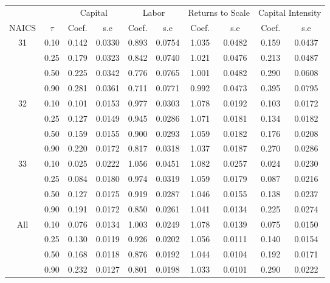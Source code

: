\begin{table}[H]
\centering
\begin{tabular}{cccccccccc}
  \hline\hline & & \multicolumn{2}{c}{Capital}  & \multicolumn{2}{c}{Labor} & \multicolumn{2}{c}{Returns to Scale} & \multicolumn{2}{c}{Capital Intensity}\\ \cmidrule(lr){3-4} \cmidrule(lr){5-6} \cmidrule(lr){7-8} \cmidrule(lr){9-10}NAICS & $\tau$ & Coef. & s.e & Coef. & s.e & Coef. & s.e & Coef. & s.e \\ 
  \hline
31 & 0.10 & 0.142 & 0.0330 & 0.893 & 0.0754 & 1.035 & 0.0482 & 0.159 & 0.0437 \\ 
   & 0.25 & 0.179 & 0.0323 & 0.842 & 0.0740 & 1.021 & 0.0476 & 0.213 & 0.0487 \\ 
   & 0.50 & 0.225 & 0.0342 & 0.776 & 0.0765 & 1.001 & 0.0482 & 0.290 & 0.0608 \\ 
   & 0.90 & 0.281 & 0.0361 & 0.711 & 0.0771 & 0.992 & 0.0473 & 0.395 & 0.0795 \\ 
  32 & 0.10 & 0.101 & 0.0153 & 0.977 & 0.0303 & 1.078 & 0.0192 & 0.103 & 0.0172 \\ 
   & 0.25 & 0.127 & 0.0149 & 0.945 & 0.0286 & 1.071 & 0.0181 & 0.134 & 0.0182 \\ 
   & 0.50 & 0.159 & 0.0155 & 0.900 & 0.0293 & 1.059 & 0.0182 & 0.176 & 0.0208 \\ 
   & 0.90 & 0.220 & 0.0172 & 0.817 & 0.0318 & 1.037 & 0.0187 & 0.270 & 0.0286 \\ 
  33 & 0.10 & 0.025 & 0.0222 & 1.056 & 0.0451 & 1.082 & 0.0257 & 0.024 & 0.0230 \\ 
   & 0.25 & 0.084 & 0.0180 & 0.974 & 0.0319 & 1.059 & 0.0179 & 0.087 & 0.0216 \\ 
   & 0.50 & 0.127 & 0.0175 & 0.919 & 0.0287 & 1.046 & 0.0155 & 0.138 & 0.0237 \\ 
   & 0.90 & 0.191 & 0.0172 & 0.850 & 0.0261 & 1.041 & 0.0134 & 0.225 & 0.0274 \\ 
  All & 0.10 & 0.076 & 0.0134 & 1.003 & 0.0249 & 1.078 & 0.0139 & 0.075 & 0.0150 \\ 
   & 0.25 & 0.130 & 0.0119 & 0.926 & 0.0202 & 1.056 & 0.0111 & 0.140 & 0.0154 \\ 
   & 0.50 & 0.168 & 0.0118 & 0.876 & 0.0192 & 1.044 & 0.0104 & 0.192 & 0.0171 \\ 
   & 0.90 & 0.232 & 0.0127 & 0.801 & 0.0198 & 1.033 & 0.0101 & 0.290 & 0.0222 \\ 
   \hline
\end{tabular}
\end{table}

